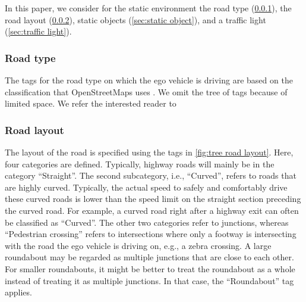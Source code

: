 \documentclass[twoside,twocolumn,9pt]{extarticle}
\theoremstyle{plain}
\begin{document}
In this paper, we consider for the static environment the road type (\cref{sec:road type}), the road layout (\cref{sec:road layout}), static objects (\cref{sec:static object}), and a traffic light (\cref{sec:traffic light}).



\subsubsection{Road type}
\label{sec:road type}

The tags for the road type on which the ego vehicle is driving are based on the classification that OpenStreetMaps uses \autocite{HighwayKeyOSM}. We omit the tree of tags because of limited space. We refer the interested reader to \autocite{HighwayKeyOSM}

%



\subsubsection{Road layout}
\label{sec:road layout}

The layout of the road is specified using the tags in \cref{fig:tree road layout}. Here, four categories are defined. Typically, highway roads will mainly be in the category ``Straight''. The second subcategory, i.e., ``Curved'', refers to roads that are highly curved. Typically, the actual speed to safely and comfortably drive these curved roads is lower than the speed limit on the straight section preceding the curved road. For example, a curved road right after a highway exit can often be classified as ``Curved''. The other two categories refer to junctions, whereas ``Pedestrian crossing'' refers to intersections where only a footway is intersecting with the road the ego vehicle is driving on, e.g., a zebra crossing. A large roundabout may be regarded as multiple junctions that are close to each other. For smaller roundabouts, it might be better to treat the roundabout as a whole instead of treating it as multiple junctions. In that case, the ``Roundabout'' tag applies.
\end{document}
